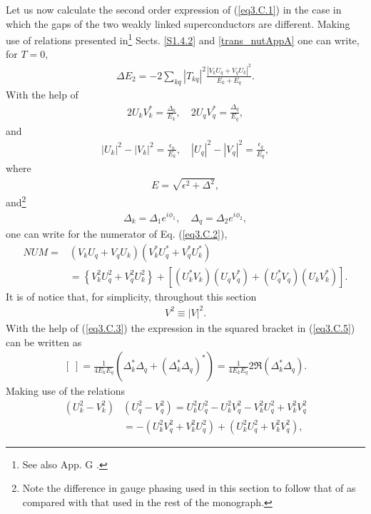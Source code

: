 Let us now calculate the second order expression of  (\ref{eq3.C.1}) in the case in which the gaps of the two weakly linked superconductors are different.
Making use of  relations presented in\footnote{See also App. G \cite{Brink:05}.} Sects. \ref{S1.4.2} and \ref{trans_nutAppA} one can write, for $T=0$,
\begin{align}\label{eq3.C.2}
\Delta E_2=-2\sum_{kq}|T_{kq}|^2\frac{|V_kU_q+V_qU_k|^2}{E_k+E_q}.
\end{align}
With the help of 
\begin{align}\label{eq3.C.3}
2U_kV_k^*=\frac{\Delta_k}{E_k},\quad 2U_qV_q^*=\frac{\Delta_q}{E_q},
\end{align}
and
\begin{align}
|U_k|^2-|V_k|^2=\frac{\epsilon_k}{E_k},\quad |U_q|^2-|V_q|^2=\frac{\epsilon_q}{E_q},
\end{align}
where
\begin{align}
E=\sqrt{\epsilon^2+\Delta^2},
\end{align}
and\footnote{Note the difference in gauge phasing used in this section to follow that of \cite{Anderson:64b} as compared with that used in the rest of the monograph.}
\begin{align}\label{eq3.C.6}
\Delta_k=\Delta_1e^{i\phi_1},\quad \Delta_q=\Delta_2e^{i\phi_2},
\end{align}
one can write for the numerator of Eq. (\ref{eq3.C.2}),
\begin{align}\label{eq3.C.5}
\nonumber NUM=&\left(V_kU_q+V_qU_k\right)\left(V^*_kU^*_q+V^*_qU^*_k\right)\\
&=\left\{V^2_kU^2_q+V^2_qU^2_k\right\}+\left[(U_k^*V_k)(U_qV^*_q)+(U_q^*V_q)(U_kV^*_k)\right].
\end{align}
It is of notice that, for simplicity, throughout this section
\begin{align}
V^2\equiv|V|^2.
\end{align}
With the help of (\ref{eq3.C.3}) the expression in the squared bracket in (\ref{eq3.C.5}) can be written as 
\begin{align}\label{eq3.C.9}
[\;]=\frac{1}{4E_kE_q}\left(\Delta_k^*\Delta_q+(\Delta_k^*\Delta_q)^*\right)=\frac{1}{4E_kE_q}2\Re(\Delta_k^*\Delta_q).
\end{align}
Making use of the relations
\begin{align}
\nonumber \left(U_k^2-V_k^2\right)&\left(U_q^2-V_q^2\right)=U_k^2U_q^2-U_k^2V_q^2-V_k^2U_q^2+V_k^2V_q^2\\
&=-\left(U_k^2V_q^2+V_k^2U_q^2\right)+\left(U_k^2U_q^2+V_k^2V_q^2\right),
\end{align}
